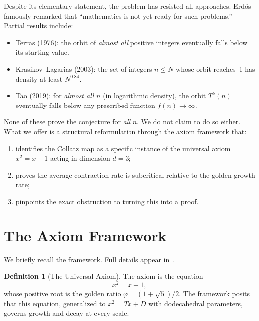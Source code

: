 \documentclass[11pt,a4paper]{article}
\theoremstyle{definition}
\newtheorem{definition}[theorem]{Definition}
\begin{document}
Despite its elementary statement, the problem has resisted all approaches.
Erd\H{o}s famously remarked that ``mathematics is not yet ready for such
problems.'' Partial results include:
\begin{itemize}[nosep]
  \item Terras (1976): the orbit of \emph{almost all} positive integers
    eventually falls below its starting value.
  \item Krasikov--Lagarias (2003): the set of integers $n \leq N$ whose orbit
    reaches~1 has density at least $N^{0.84}$.
  \item Tao (2019): for \emph{almost all} $n$ (in logarithmic density), the
    orbit $T^k(n)$ eventually falls below any prescribed function
    $f(n) \to \infty$.
\end{itemize}

None of these prove the conjecture for \emph{all} $n$. We do not claim to do
so either. What we offer is a structural reformulation through the axiom
framework that:
\begin{enumerate}[nosep]
  \item identifies the Collatz map as a specific instance of the universal
    axiom $x^2 = x + 1$ acting in dimension $d = 3$;
  \item proves the average contraction rate is subcritical relative to the
    golden growth rate;
  \item pinpoints the exact obstruction to turning this into a proof.
\end{enumerate}

\section{The Axiom Framework}\label{sec:axiom}

We briefly recall the framework. Full details appear in~\cite{core_eq}.

\begin{definition}[The Universal Axiom]
The axiom is the equation
\begin{equation}\label{eq:axiom}
  x^2 = x + 1,
\end{equation}
whose positive root is the golden ratio $\varphi = (1 + \sqrt{5})/2$. The
framework posits that this equation, generalized to $x^2 = Tx + D$ with
dodecahedral parameters, governs growth and decay at every scale.
\end{definition}
\end{document}
